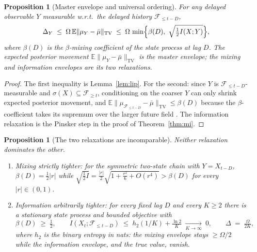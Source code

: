 \documentclass[11pt]{article}
\newtheorem{proposition}[theorem]{Proposition}
\newcommand{\TV}{\mathrm{TV}}
\newcommand{\E}{\mathbb{E}}
\begin{document}
\begin{proposition}[Master envelope and universal ordering]\label{prop:order}
For any delayed observable $Y$ measurable w.r.t.\ the delayed history
$\mathcal F_{\le t-D}$,
\[
\Delta_Y
\;\le\;\Omega\,\E\|\mu_Y-\bar\mu\|_{\TV}
\;\le\;\Omega\,\min\Bigl\{\beta(D),\ \sqrt{\tfrac12 I(X;Y)}\Bigr\},
\]
where $\beta(D)$ is the $\beta$-mixing coefficient of the state process at
lag $D$. The expected posterior movement
$\E\|\mu_Y-\bar\mu\|_{\TV}$ is the master envelope; the mixing and
information envelopes are its two relaxations.
\end{proposition}

\begin{proof}
The first inequality is Lemma~\ref{lem:lip}. For the second: since
$Y$ is $\mathcal F_{\le t-D}$-measurable and $\sigma(X)\subseteq
\mathcal F_{\ge t}$, conditioning on the coarser $Y$ can only shrink
expected posterior movement, and
$\E\|\mu_{\mathcal F_{\le t-D}}-\bar\mu\|_{\TV}\le\beta(D)$ because the
$\beta$-coefficient takes its supremum over the larger future field
\cite[App.~A]{infocom}. The information relaxation is the Pinsker step in the
proof of Theorem~\ref{thm:mi}.
\end{proof}

\begin{proposition}[The two relaxations are incomparable]\label{prop:incomp}
Neither relaxation dominates the other.
\begin{enumerate}
\item[(i)] \emph{Mixing strictly tighter:} for the symmetric two-state chain
with $Y=X_{t-D}$, $\beta(D)=\tfrac12 |r|$ while
$\sqrt{\tfrac12 I}=\tfrac {|r|}2\sqrt{1+\tfrac{r^2}{6}+O(r^4)}>\beta(D)$ for
every $|r|\in(0,1)$.
\item[(ii)] \emph{Information arbitrarily tighter:} for every fixed lag $D$
and every $K\ge 2$ there is a stationary state process and bounded
objective with
\[
\beta(D)\;\ge\;\tfrac12,
\qquad
I(X_t;\mathcal F_{\le t-D})\;\le\;h_2(1/K)+\tfrac{\ln 2}{K}\;\xrightarrow[K\to\infty]{}\;0,
\qquad
\Delta\;=\;\tfrac{\Omega}{2K},
\]
where $h_2$ is the binary entropy in nats: the mixing envelope stays
$\ge\Omega/2$ while the information envelope, and the true value, vanish.
\end{enumerate}
\end{proposition}
\end{document}
